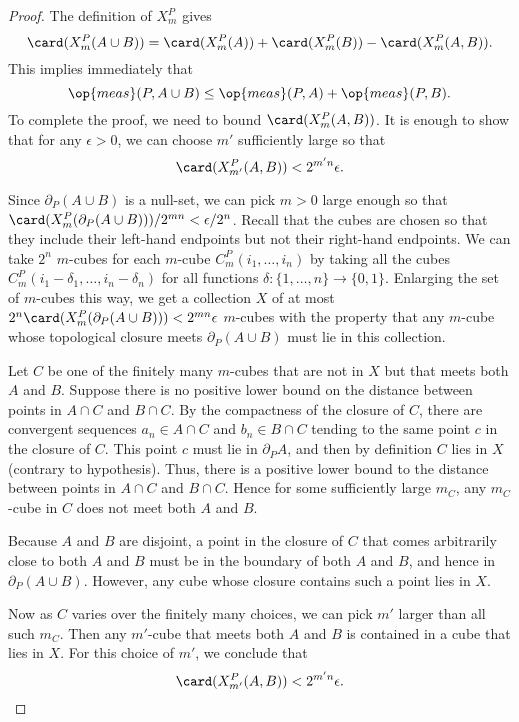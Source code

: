 \begin{proof}    The definition of $X^P_m$ gives
    $$
    \card(X^P_m(A\cup B)) = \card(X^P_m (A)) + \card(X^P_m(B)) -
    \card(X^P_m(A,B)).$$
This implies immediately that
    $$\op{meas}(P,A\cup B) \le \op{meas}(P,A) + \op{meas}(P,B).$$
To complete the proof, we need to bound $\card(X^P_m(A,B))$.  It is
enough to show that for any $\epsilon >0$, we can choose $m'$
sufficiently large so that
    $$\card(X^P_{m'}(A,B)) < 2^{m' n} \epsilon.$$

Since $\partial_P (A\cup B)$ is a null-set, we can pick $m>0$ large
enough so that $\card(X^P_m(\partial_P (A\cup B)))/2^{m n} <
\epsilon/2^n$. Recall that the cubes are chosen so that they include
their left-hand endpoints but not their right-hand endpoints.  We
can take $2^n$ $m$-cubes for each $m$-cube $C_m^P(i_1,\ldots,i_n)$
by taking all the cubes $C_m^P(i_1- \delta_1,\ldots,i_n-\delta_n)$
for all functions $\delta:\{1,\ldots,n\}\to \{0,1\}$.  Enlarging the
set of $m$-cubes this way, we get a collection $X$ of at most $2^n
\card(X^P_m(\partial_P (A\cup B))) < 2^{m n}\epsilon$ $m$-cubes with
the property that any $m$-cube whose topological closure meets
$\partial_P(A\cup B)$ must lie in this collection.

Let $C$ be one of the finitely many $m$-cubes that are not in $X$
but that meets both $A$ and $B$. Suppose there is no positive lower
bound on the distance between points in $A\cap C$ and $B\cap C$. By
the compactness of the closure of $C$, there are convergent
sequences $a_n\in A\cap C$ and $b_n\in B\cap C$ tending to the same
point $c$ in the closure of $C$.  This point $c$ must lie in
$\partial_P A$, and then by definition $C$ lies in $X$ (contrary to
hypothesis). Thus, there is a positive lower bound to the distance
between points in $A\cap C$ and $B\cap C$.  Hence for some
sufficiently large $m_C$, any $m_C$-cube in $C$ does not meet both
$A$ and $B$.


Because $A$ and $B$ are disjoint, a point in the closure of $C$ that
comes arbitrarily close to both $A$ and $B$ must be in the boundary
of both $A$ and $B$, and hence in $\partial_P(A\cup B)$.  However,
any cube whose closure contains such a point lies in $X$.

Now as $C$ varies over the finitely many choices, we can pick $m'$
larger than all such $m_C$.  Then any $m'$-cube that meets both $A$
and $B$ is contained in a cube that lies in $X$.  For this choice of
$m'$, we conclude that
    $$\card(X^P_{m'}(A,B)) < 2^{m' n}\epsilon.$$
\end{proof}


